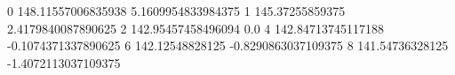 0 148.11557006835938 5.1609954833984375
1 145.37255859375 2.4179840087890625
2 142.95457458496094 0.0
4 142.84713745117188 -0.1074371337890625
6 142.12548828125 -0.8290863037109375
8 141.54736328125 -1.4072113037109375
